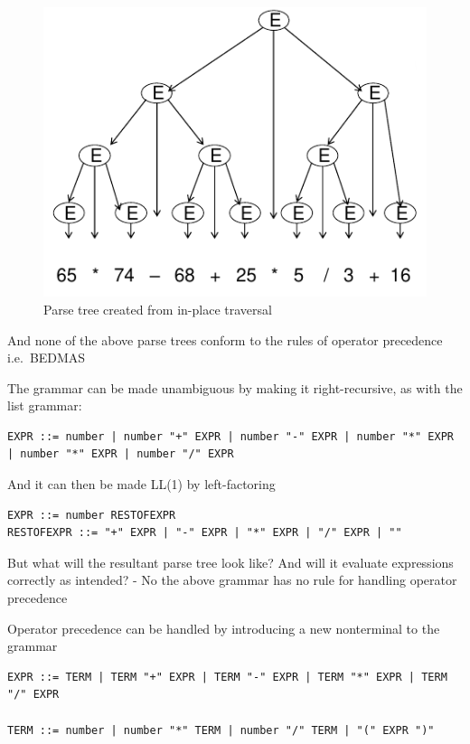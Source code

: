 \documentclass[
]{book}
\begin{document}
\begin{figure}
\includegraphics{img/09-image14} \caption{Parse tree created from in-place traversal}\label{fig:infix-recursive}
\end{figure}

And none of the above parse trees conform to the rules of operator precedence i.e.~BEDMAS

The grammar can be made unambiguous by making it right-recursive, as with the list grammar:

\begin{verbatim}
EXPR ::= number | number "+" EXPR | number "-" EXPR | number "*" EXPR | number "*" EXPR | number "/" EXPR
\end{verbatim}

And it can then be made LL(1) by left-factoring

\begin{verbatim}
EXPR ::= number RESTOFEXPR
RESTOFEXPR ::= "+" EXPR | "-" EXPR | "*" EXPR | "/" EXPR | ""
\end{verbatim}

But what will the resultant parse tree look like? And will it evaluate expressions correctly as intended? - No the above grammar has no rule for handling operator precedence

Operator precedence can be handled by introducing a new nonterminal to the grammar

\begin{verbatim}
EXPR ::= TERM | TERM "+" EXPR | TERM "-" EXPR | TERM "*" EXPR | TERM "/" EXPR

TERM ::= number | number "*" TERM | number "/" TERM | "(" EXPR ")"
\end{verbatim}
\end{document}
